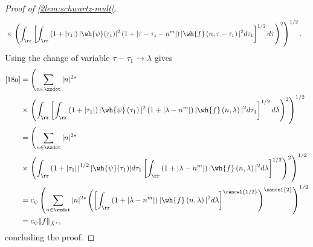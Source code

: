 \begin{proof}[Proof of \cref{2lem:schwartz-mult}]
\begin{equation}
\begin{split}
		& \times \left. \left( \int_\rr \left[ \int_\rr
		\left( 1 + | \tau_{1} | \right) | \wh{\psi}(\tau_1) |^2 \left( 1 + |
		\tau - \tau_1 - n^{m} |
		\right) | \wh{f}\left( n, \tau - \tau_1 \right) |^2 d \tau_1 
		\right]^{1/2} d \tau \right)^2 \right)^{1/2}.
	\end{split}
\end{equation}
%
%
Using the change of variable $\tau - \tau_1 \to \lambda$ gives
%
%
\begin{equation*}
	\begin{split}
		\eqref{18a}
		& = \left( \sum_{n \in \zzdot} |n|^{2s}\right.
		\\
		& \times \left.  \left( \int_\rr \left[
		\int_\rr \left( 1 + | \tau_1 | \right) | \wh{\psi}\left( \tau_1
		\right) |^2 \left( 1 + | \lambda - n^{m} | \right) | \wh{f} \left( n,
		\lambda
		\right)|^2 d \tau_1 \right]^{1/2} d \lambda \right)^2 \right)^{1/2}
		\\
		& =  \left( \sum_{n \in \zzdot} |n|^{2s} \right.
		\\
		& \times \left. \left( \int_\rr \left( 1 + |
		\tau_1 |
		\right)^{1/2} | \wh{\psi}(\tau_1) | d \tau_1 \left[ \int_\rr \left( 1 + |
		\lambda - n^{m} |
		\right) | \wh{f}\left( n, \lambda \right) |^2 d \lambda \right]^{1/2}
		\right)^2 \right)^{1/2}
		\\
		& = c_{\psi} \left( \sum_{n \in \zzdot} |n|^{2s} \left( \left[ \int_\rr
		\left( 1 + | \lambda - n^{m} | \right) | \wh{f}\left( n, \lambda
		\right) |^2 d \lambda
		\right]^{\cancel{1/2}} \right)^{\cancel{2}} \right)^{1/2}
		\\
		& = c_{\psi} \|f\|_{\dot{X}^s},
	\end{split}
\end{equation*}
%
%
concluding the proof. 
\end{proof}

